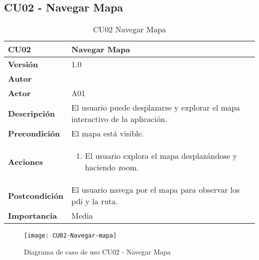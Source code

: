 \subsection{CU02 - Navegar Mapa}


\begin{table}[p]
	\centering
	\begin{tabularx}{\linewidth}{ p{} p{} }
		\toprule
		\textbf{CU02}    & \textbf{Navegar Mapa} \\
		\toprule
		\textbf{Versión}              & 1.0    \\
		\textbf{Autor}                & \autor \\
		\textbf{Actor}                & A01 \\
		\textbf{Descripción}          & El usuario puede desplazarse y explorar el mapa interactivo de la aplicación. \\
		\textbf{Precondición}         & El mapa está visible. \\
		\textbf{Acciones}             &
		\begin{enumerate}
			\def\labelenumi{\arabic{enumi}.}
			\tightlist
			\item El usuario explora el mapa desplazándose y haciendo zoom.
		\end{enumerate}\\
		\textbf{Postcondición}        & El usuario navega por el mapa para observar los \acrshort{pdi} y la ruta. \\
		\textbf{Importancia}          & Media \\
		\bottomrule
	\end{tabularx}
	\caption{CU02 Navegar Mapa}
\end{table}


\begin{figure}[H]
	\centering
	\texttt{[image: CU02-Navegar-mapa]}
	\caption{Diagrama de caso de uso CU02 - Navegar Mapa}
	\label{CU02-Navegar-mapa}
\end{figure}



